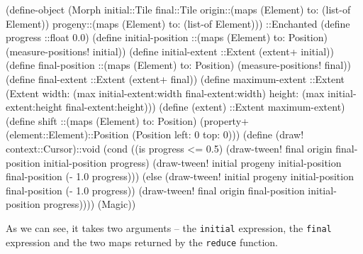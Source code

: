 \documentclass[acmsmall]{acmart}
\newenvironment{Snippet}{\Verbatim[samepage=true]}{\endVerbatim}
\begin{document}
\begin{Snippet}
(define-object (Morph initial::Tile final::Tile
		      origin::(maps (Element) to: (list-of Element))
		      progeny::(maps (Element) to: (list-of Element)))
  ::Enchanted
\end{Snippet}
\begin{Snippet}
  (define progress ::float 0.0)
\end{Snippet}
\begin{Snippet}
  (define initial-position ::(maps (Element) to: Position)
    (measure-positions! initial))
\end{Snippet}
\begin{Snippet}
  (define initial-extent ::Extent
    (extent+ initial))
\end{Snippet}
\begin{Snippet}
  (define final-position ::(maps (Element) to: Position)
    (measure-positions! final))
\end{Snippet}
\begin{Snippet}
  (define final-extent ::Extent
    (extent+ final))
\end{Snippet}
\begin{Snippet}
  (define maximum-extent ::Extent
    (Extent width: (max initial-extent:width final-extent:width)
	    height: (max initial-extent:height final-extent:height)))
\end{Snippet}
\begin{Snippet}
  (define (extent) ::Extent maximum-extent)
\end{Snippet}
\begin{Snippet}
  (define shift ::(maps (Element) to: Position)
    (property+ (element::Element)::Position
	       (Position left: 0 top: 0)))
\end{Snippet}
\begin{Snippet}
  (define (draw! context::Cursor)::void
    (cond ((is progress <= 0.5) 
 	   (draw-tween! final origin final-position initial-position progress)
           (draw-tween! initial progeny initial-position final-position 
                        (- 1.0 progress)))
	  (else
           (draw-tween! initial progeny initial-position final-position 
                        (- 1.0 progress))
           (draw-tween! final origin final-position initial-position progress))))
  (Magic))
\end{Snippet}

As we can see, it takes two arguments -- the \texttt{initial}
expression, the \texttt{final} expression and the two maps returned by
the \texttt{reduce} function.
\end{document}
